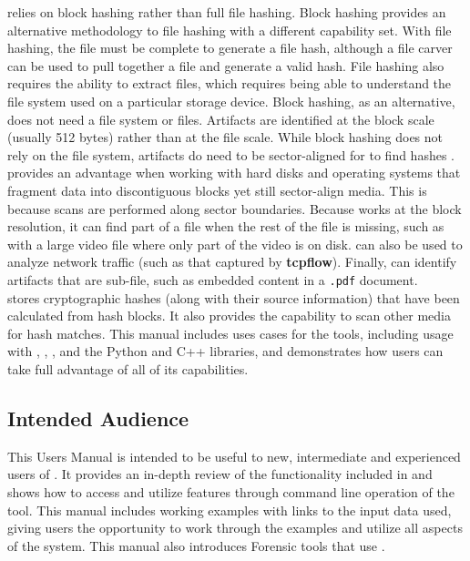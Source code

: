 \documentclass[11pt,fleqn]{article} %
\begin{document}
\hdb relies on block hashing rather than full file hashing. Block hashing provides an alternative methodology to file hashing with a different capability set. With file hashing, the file must be complete to generate a file hash, although a file carver can be used to pull together a file and generate a valid hash.  File hashing also requires the ability to extract files, which requires being able to understand the file system used on a particular storage device. Block hashing, as an alternative, does not need a file system or files. Artifacts are identified at the block scale (usually 512 bytes) rather than at the file scale. While block hashing does not rely on the file system, artifacts do need to be sector-aligned for \hdb to find hashes \cite{hashEncoding}.\\

\hdb provides an advantage when working with hard disks and operating systems that fragment data into discontiguous blocks yet still sector-align media. This is because scans are performed along sector boundaries. Because \hdb works at the block resolution, it can find part of a file when the rest of the file is missing, such as with a large video file where only part of the video is on disk. \hdb can also be used to analyze network traffic (such as that captured by \textbf{tcpflow}).  Finally, \hdb can identify artifacts that are sub-file, such as embedded content in a \texttt{.pdf} document.\\

\hdb stores cryptographic hashes (along with their source information) that have been calculated from hash blocks. It also provides the capability to scan other media for hash matches.
This manual includes uses cases for the \hdb tools, including usage with \aut, \sscope, \bulk, and the \hdb Python and C++ libraries, and demonstrates how users can take full advantage of all of its capabilities.

\subsection{Intended Audience}
This Users Manual is intended to be useful to new, intermediate and experienced users of \hdb. It provides an in-depth review of the functionality included in \hdb and shows how to access and utilize features through command line operation of the tool. This manual includes working examples with links to the input data used, giving users the opportunity to work through the examples and utilize all aspects of the system.  This manual also introduces Forensic tools that use \hdb.\\
\end{document}
